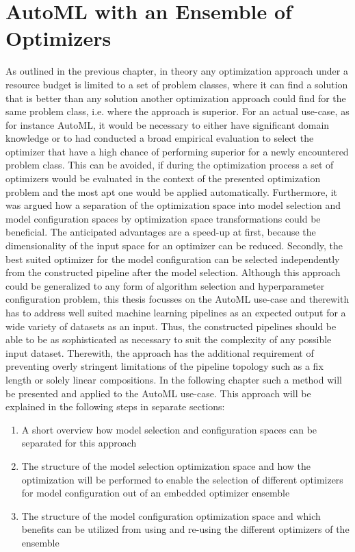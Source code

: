 %
\chapter{AutoML with an Ensemble of Optimizers}
\label{sec:approach}
As outlined in the previous chapter, in theory any optimization approach under a resource budget is limited to a set of problem classes, where it can find a solution that is better than any solution another optimization approach could find for the same problem class, i.e. where the approach is superior.
For an actual use-case, as for instance AutoML, it would be necessary to either have significant domain knowledge or to had conducted a broad empirical evaluation to select the optimizer that have a high chance of performing superior for a newly encountered problem class.
This can be avoided, if during the optimization process a set of optimizers would be evaluated in the context of the presented optimization problem and the most apt one would be applied automatically.\newline
Furthermore, it was argued how a separation of the optimization space into model selection and model configuration spaces by optimization space transformations could be beneficial.
The anticipated advantages are a speed-up at first, because the dimensionality of the input space for an optimizer can be reduced.
Secondly, the best suited optimizer for the model configuration can be selected independently from the constructed pipeline after the model selection.\newline
Although this approach could be generalized to any form of algorithm selection and hyperparameter configuration problem, this thesis focusses on the AutoML use-case and therewith has to address well suited machine learning pipelines as an expected output for a wide variety of datasets as an input.
Thus, the constructed pipelines should be able to be as sophisticated as necessary to suit the complexity of any possible input dataset.
Therewith, the approach has the additional requirement of preventing overly stringent limitations of the pipeline topology such as a fix length or solely linear compositions.\newline
In the following chapter such a method will be presented and applied to the AutoML use-case.
This approach will be explained in the following steps in separate sections:
\begin{enumerate}
    \item A short overview how model selection and configuration spaces can be separated for this approach
    \item The structure of the model selection optimization space and how the optimization will be performed to enable the selection of different optimizers for model configuration out of an embedded optimizer ensemble
    \item The structure of the model configuration optimization space and which benefits can be utilized from using and re-using the different optimizers of the ensemble
\end{enumerate}

